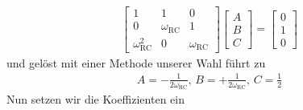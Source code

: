 \begin{Loesung}
\begin{itemize}
\begin{align}
\begin{bmatrix}
1 & 1 & 0\\
0 & \omega_\mathrm{RC} & 1\\
\omega_\mathrm{RC}^2 & 0 & \omega_\mathrm{RC}
\end{bmatrix}
\begin{bmatrix}
A\\B\\C
\end{bmatrix}
=
\begin{bmatrix}
0\\1\\0
\end{bmatrix}
\end{align}
und gelöst mit einer Methode unserer Wahl führt zu
\begin{align}
A = -\frac{1}{2\omega_\mathrm{RC}},\,B = +\frac{1}{2\omega_\mathrm{RC}},\,C = \frac{1}{2}
\end{align}
Nun setzen wir die Koeffizienten ein

\end{itemize}
\end{Loesung}
